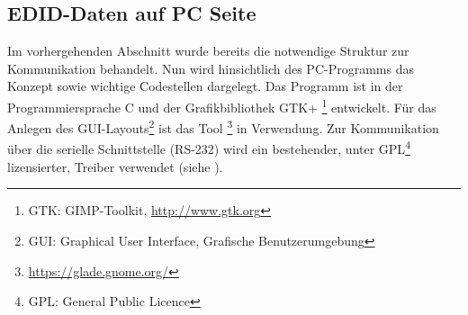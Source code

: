 \subsection{EDID-Daten auf PC Seite}
\label{edid_pc}
Im vorhergehenden Abschnitt wurde bereits die notwendige Struktur zur Kommunikation behandelt. Nun wird hinsichtlich des PC-Programms das Konzept sowie wichtige Codestellen dargelegt. Das Programm ist in der Programmiersprache C und der Grafikbibliothek GTK+ \footnote{GTK: GIMP-Toolkit, \url{http://www.gtk.org}} entwickelt. Für das Anlegen des GUI-Layouts\footnote{GUI: Graphical User Interface, Grafische Benutzerumgebung} ist das Tool \footnote{\url{https://glade.gnome.org/}} in Verwendung. Zur Kommunikation über die serielle Schnittstelle (RS-232) wird ein bestehender, unter GPL\footnote{GPL: General Public Licence} lizensierter, Treiber verwendet (siehe \cite{rs232_lib}).

